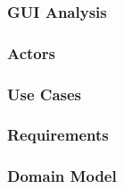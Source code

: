 
\subsubsection{GUI Analysis}

\subsubsection{Actors}

\subsubsection{Use Cases}

\subsubsection{Requirements}

\subsubsection{Domain Model}
